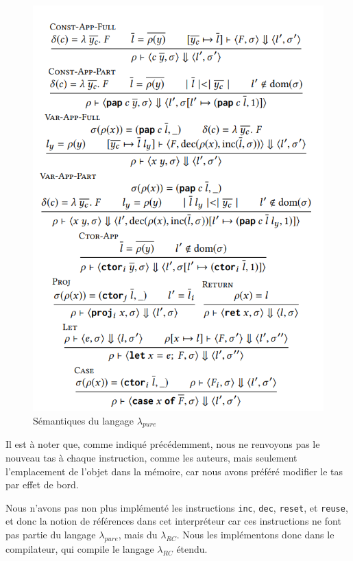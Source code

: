 \documentclass{rapportECL}
\begin{document}
\begin{figure}[hbt!]
	\centering
	\includegraphics[scale=0.80]{logos/semantics.png}
	\caption{Sémantiques du langage $\lambda_{pure}$}
	\label{fig:semantics}
\end{figure}
\FloatBarrier 


\bigskip


Il est à noter que, comme indiqué précédemment, nous ne renvoyons pas le nouveau tas à chaque instruction, comme les auteurs, 
mais seulement l'emplacement de l'objet dans la mémoire, car nous avons préféré modifier le tas par effet de bord.

Nous n'avons pas non plus implémenté les instructions \verb|inc|, \verb|dec|, \verb|reset|, et \verb|reuse|, et donc la notion de références dans cet interpréteur car ces instructions ne font pas partie du langage $\lambda_{pure}$, mais du $\lambda_{RC}$.
Nous les implémentons donc dans le compilateur, qui compile le langage $\lambda_{RC}$ étendu.
\end{document}
